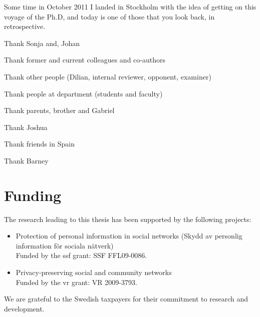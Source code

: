 
Some time in October 2011 I landed in Stockholm with the idea of getting on this 
voyage of the Ph.D, and today is one of those that you look back, in retrospective.

Thank Sonja and, Johan

Thank former and current colleagues and co-authors

Thank other people (Dilian, internal reviewer, opponent, examiner)

Thank people at department (students and faculty)

Thank parents, brother and Gabriel

Thank Joshua

Thank friends in Spain

Thank Barney


\section*{Funding}
The research leading to this thesis has been supported by the following projects:
\begin{itemize}
    \item Protection of personal information in social networks (Skydd av personlig 
    information f{\"o}r sociala n{\"a}tverk)\\
    Funded by the \ac*{ssf} grant: SSF FFL09-0086.
    \item Privacy-preserving social and community networks\\
    Funded by the \ac*{vr} grant: VR 2009-3793.
\end{itemize}

We are grateful to the Swedish taxpayers for their commitment to research and development.
